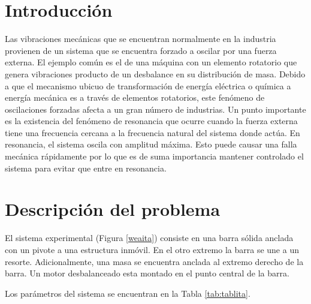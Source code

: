 \documentclass[letterpaper,11pt]{article} %
\begin{document}







\section{Introducción}
Las vibraciones mecánicas que se encuentran normalmente en la industria provienen de un sistema que se encuentra forzado a oscilar por una fuerza externa. El ejemplo común es el de una máquina con un elemento rotatorio que genera vibraciones producto de un desbalance en su distribución de masa. Debido a que el mecanismo ubicuo de transformación de energía eléctrica o química a energía mecánica es a través de elementos rotatorios, este fenómeno de oscilaciones forzadas afecta a un gran número de industrias. 
Un punto importante es la existencia del fenómeno de resonancia que ocurre cuando la fuerza externa tiene una frecuencia cercana a la frecuencia natural del sistema donde actúa. En resonancia, el sistema oscila con amplitud máxima. Esto puede causar una falla mecánica rápidamente por lo que es de suma importancia mantener controlado el sistema para evitar que entre en resonancia. 

\section{Descripción del problema}
El sistema experimental (Figura \ref{weaita}) consiste en una barra sólida anclada con un pivote a una estructura inmóvil.  En el otro extremo la barra se une a un resorte. Adicionalmente, una masa se encuentra anclada al extremo derecho de la barra. Un motor desbalanceado esta montado en el punto central de la barra.

Los parámetros del sistema se encuentran en la Tabla \ref{tab:tablita}.
\end{document}
